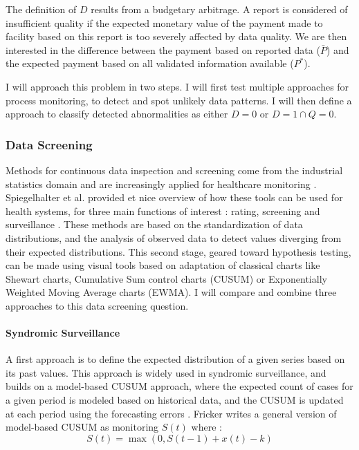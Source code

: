 The definition of $D$ results from a budgetary arbitrage. A report is considered of insufficient quality if the expected monetary value of the payment made to facility based on this report is too severely affected by data quality. We are then interested in the difference between the payment based on reported data ($\bar{P}$) and the expected payment based on all validated information available ($P^{*}$).


I will approach this problem in two steps. I will first test multiple approaches for process monitoring, to detect and spot unlikely data patterns. I will then define a approach to classify detected abnormalities as either $D = 0$ or $D = 1 \cap Q = 0$.

\subsubsection{Data Screening}

Methods for continuous data inspection and screening come from the industrial statistics domain and are increasingly applied for healthcare monitoring \cite{woodall_use_2006,woodall_current_2014}. Spiegelhalter et al. provided et nice overview of how these tools can be used for health systems, for three main functions of interest : rating, screening and surveillance \cite{spiegelhalter_statistical_2012}. These methods are based on the standardization of data distributions, and the analysis of observed data to detect values diverging from their expected distributions. This second stage, geared toward hypothesis testing, can be made using visual tools based on adaptation of classical charts like Shewart charts, Cumulative Sum control charts (CUSUM) or Exponentially Weighted Moving Average charts (EWMA). I will compare and combine three approaches to this data screening question.

\paragraph{Syndromic Surveillance} A first approach is to define the expected distribution of a given series based on its past values. This approach is widely used in syndromic surveillance, and builds on a model-based CUSUM approach, where the expected count of cases for a given period is modeled based on historical data, and the CUSUM is updated at each period using the forecasting errors \cite{fricker_comparing_2008}. Fricker writes a general version of model-based CUSUM as monitoring $S(t)$ where :
$$ S(t) = \max(0 , S(t-1) + x(t) - k)$$


